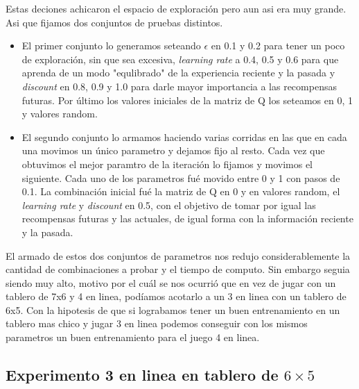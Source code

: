 Estas deciones achicaron el espacio de exploración pero aun asi era muy grande. Asi que fijamos dos conjuntos de pruebas distintos. 

\begin{itemize}
  \item El primer conjunto lo generamos seteando \textbf{$\epsilon$} en 0.1 y 0.2 para tener un poco de exploración, sin que sea excesiva, \textit{learning rate} a 0.4, 0.5 y 0.6 para que aprenda de un modo "equlibrado" de la experiencia reciente y la pasada y \textit{discount} en 0.8, 0.9 y 1.0 para darle mayor importancia a las recompensas futuras. Por último los valores iniciales de la matriz de Q los seteamos en 0, 1 y valores random. 
   
  \item  El segundo conjunto lo armamos haciendo varias corridas en las que en cada una movimos un único parametro y dejamos fijo al resto. Cada vez que obtuvimos el mejor paramtro de la iteración lo fijamos y movimos el siguiente. Cada uno de los parametros fué movido entre 0 y 1 con pasos de 0.1. La combinación inicial fué la matriz de Q en 0 y en valores random, el \textit{learning rate} y \textit{discount} en 0.5, con el objetivo de tomar por igual las recompensas futuras y las actuales, de igual forma con la información reciente y la pasada. \\
\end{itemize} 

El armado de estos dos conjuntos de parametros nos redujo considerablemente la cantidad de combinaciones a probar y el tiempo de computo. Sin embargo seguia siendo muy alto, motivo por el cuál se nos ocurrió que en vez de jugar con un tablero de 7x6 y 4 en linea, podíamos acotarlo a un 3 en linea con un tablero de 6x5. Con la hipotesis de que si lograbamos tener un buen entrenamiento en un tablero mas chico y jugar 3 en linea podemos conseguir con los mismos parametros un buen entrenamiento para el juego 4 en linea.



\subsection{Experimento 3 en linea en tablero de $6\times5$}

